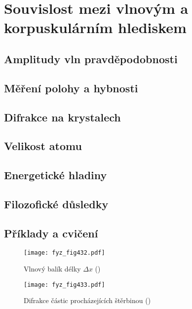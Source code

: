 {
\chapter{Souvislost mezi vlnovým a korpuskulárním hlediskem}\label{fyz:IchapXXXVIII}
\minitoc
\section{Amplitudy vln pravděpodobnosti}\label{fyz:IchapXXXVIIIsecI}
\section{Měření polohy a hybnosti}\label{fyz:IchapXXXVIIIsecII}
\section{Difrakce na krystalech}\label{fyz:IchapXXXVIIIsecIII}
\section{Velikost atomu}\label{fyz:IchapXXXVIIIsecIV}
\section{Energetické hladiny}\label{fyz:IchapXXXVIIIsecV}
\section{Filozofické důsledky}\label{fyz:IchapXXXVIIIsecVI}
\section{Příklady a cvičení}\label{fyz:IchapXXXVIIIsecVII}

  \begin{figure}[ht!] %
    \centering
    \texttt{[image: fyz\_fig432.pdf]}
    \caption{Vlnový balík délky \(\Delta x\)
             (\cite[s.~510]{Feynman01})}
    \label{fyz:fig432}
  \end{figure}

  \begin{figure}[ht!] %
    \centering
    \texttt{[image: fyz\_fig433.pdf]}
    \caption{Difrakce částic procházejících štěrbinou 
             (\cite[s.~511]{Feynman01})}
    \label{fyz:fig433}
  \end{figure}

}
